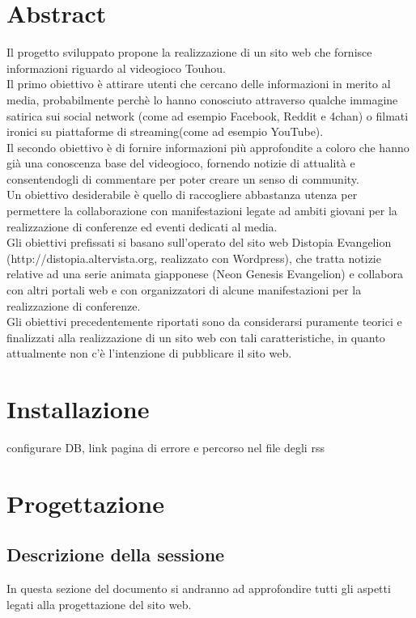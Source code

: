 \documentclass[openany, a4paper, 12pt]{report}
\begin{document}
	\chapter{Abstract}
	Il progetto sviluppato propone la realizzazione di un sito web che fornisce informazioni riguardo al videogioco Touhou.\\
	Il primo obiettivo è attirare utenti che cercano delle informazioni in merito al media, probabilmente perchè lo hanno conosciuto attraverso qualche immagine satirica sui social network (come ad esempio Facebook, Reddit e 4chan) o filmati ironici su piattaforme di streaming(come ad esempio YouTube).\\
	Il secondo obiettivo è di fornire informazioni più approfondite a coloro che hanno già una conoscenza base del videogioco, fornendo notizie di attualità e consentendogli di commentare per poter creare un senso di community.\\
	Un obiettivo desiderabile è quello di raccogliere abbastanza utenza per permettere la collaborazione con manifestazioni legate ad ambiti giovani per la realizzazione di conferenze ed eventi dedicati al media.\\
	Gli obiettivi prefissati si basano sull'operato del sito web Distopia Evangelion (http://distopia.altervista.org, realizzato con Wordpress), che tratta notizie relative ad una serie animata giapponese (Neon Genesis Evangelion) e collabora con altri portali web e con organizzatori di alcune manifestazioni per la realizzazione di conferenze.\\
	Gli obiettivi precedentemente riportati sono da considerarsi puramente teorici e finalizzati alla realizzazione di un sito web con tali caratteristiche, in quanto attualmente non c'è l'intenzione di pubblicare il sito web.

	\chapter{Installazione}
	configurare DB, link pagina di errore e percorso nel file degli rss
	
	\chapter{Progettazione}

	\section{Descrizione della sessione}
		In questa sezione del documento si andranno ad approfondire tutti gli aspetti legati alla progettazione del sito web.
\end{document}
